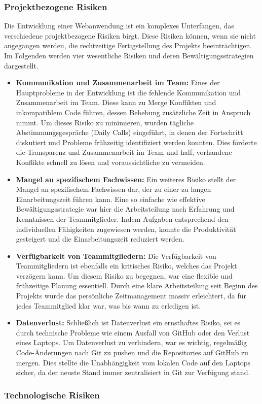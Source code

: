 \documentclass[../main.tex]{subfiles} %
\begin{document}
\subsubsection{Projektbezogene Risiken} %

Die Entwicklung einer Webanwendung ist ein komplexes Unterfangen, das verschiedene projektbezogene Risiken birgt. Diese Risiken
können, wenn sie nicht angegangen werden, die rechtzeitige Fertigstellung des Projekts beeinträchtigen. Im Folgenden werden vier
wesentliche Risiken und deren Bewältigungsstrategien dargestellt.

\begin{itemize}

	\item \textbf{Kommunikation und Zusammenarbeit im Team:}
	      Eines der Hauptprobleme in der Entwicklung ist die fehlende Kommunikation und Zusammenarbeit im Team. Diese kann zu Merge
	      Konflikten und inkompatiblem Code führen, dessen Behebung zusätzliche Zeit in Anspruch nimmt. Um dieses Risiko zu minimieren,
	      wurden tägliche Abstimmungsgespräche (Daily Calls) eingeführt, in denen der Fortschritt diskutiert und Probleme frühzeitig
	      identifiziert werden konnten. Dies förderte die Transparenz und Zusammenarbeit im Team und half, vorhandene Konflikte schnell
	      zu lösen und voraussichtliche zu vermeiden.

	\item \textbf{Mangel an spezifischem Fachwissen:}
	      Ein weiteres Risiko stellt der Mangel an spezifischem Fachwissen dar, der zu einer zu langen Einarbeitungszeit führen kann. Eine
	      so einfache wie effektive Bewältigungsstrategie war hier die Arbeitsteilung nach Erfahrung und Kenntnissen der Teammitglieder.
	      Indem Aufgaben entsprechend den individuellen Fähigkeiten zugewiesen werden, konnte die Produktivität gesteigert und die Einarbeitungszeit
	      reduziert werden.

	\item \textbf{Verfügbarkeit von Teammitgliedern:}
	      Die Verfügbarkeit von Teammitgliedern ist ebenfalls ein kritisches Risiko, welches das Projekt verzögern kann. Um diesem Risiko zu begegnen,
	      war eine flexible und frühzeitige Planung essentiell. Durch eine klare Arbeitsteilung seit Beginn des Projekts wurde das persönliche
	      Zeitmanagement massiv erleichtert, da für jedes Teammitglied klar war, was bis wann zu erledigen ist.

	\item \textbf{Datenverlust:}
	      Schließlich ist Datenverlust ein ernsthaftes Risiko, sei es durch technische Probleme wie einem Ausfall von GitHub oder den Verlust eines
	      Laptops. Um Datenverlust zu verhindern, war es wichtig, regelmäßig Code-Änderungen nach Git zu pushen und die Repositories auf GitHub zu
	      mergen. Dies stellte die Unabhängigkeit vom lokalen Code auf den Laptops sicher, da der neuste Stand immer zentralisiert in Git zur
	      Verfügung stand.

\end{itemize}

\subsubsection{Technologische Risiken} %
\end{document}
